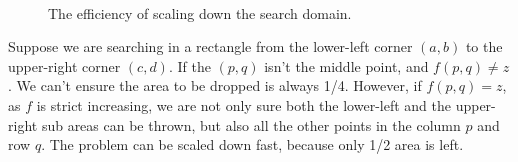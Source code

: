 \documentclass[UTF8]{article}
\begin{document}
\begin{figure}[htbp]
 \centering
  \\
 \caption{The efficiency of scaling down the search domain.}
 \label{fig:saddleback-drop}
\end{figure}

Suppose we are searching in a rectangle from the lower-left corner $(a, b)$ to the upper-right corner $(c, d)$.
If the $(p, q)$ isn't the middle point, and $f(p, q) \neq z$. We can't ensure the area to be dropped is always
1/4. However, if $f(p, q) = z$, as $f$ is strict increasing, we are not only sure both the lower-left and the
upper-right sub areas can be thrown, but also all the other points in the column $p$ and row $q$. The problem
can be scaled down fast, because only 1/2 area is left.
\end{document}
